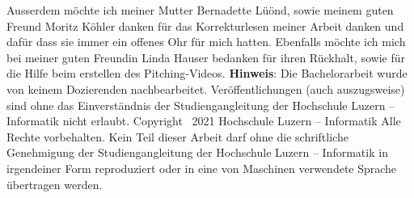 Ausserdem möchte ich meiner Mutter Bernadette Lüönd, sowie meinem guten Freund Moritz Köhler danken für das Korrekturlesen meiner Arbeit danken und dafür dass sie immer ein offenes Ohr für mich hatten.
Ebenfalls möchte ich mich bei meiner guten Freundin Linda Hauser bedanken für ihren Rückhalt, sowie für die Hilfe beim erstellen des Pitching-Videos.
\newline \newline \newline
\newline \newline \newline
\newline \newline \newline
\newline \newline \newline
{\textbf{Hinweis}}: Die Bachelorarbeit wurde von keinem Dozierenden nachbearbeitet. Ver\"offentlichungen (auch auszugsweise) sind ohne das Einverst\"andnis der Studiengangleitung der Hochschule Luzern -- Informatik nicht erlaubt.
\newline
Copyright \textcopyright\ 2021 Hochschule Luzern -- Informatik \newline \newline
Alle Rechte vorbehalten. Kein Teil dieser Arbeit darf ohne die schriftliche Genehmigung der Studiengangleitung der Hochschule Luzern -- Informatik in irgendeiner Form reproduziert oder in eine von Maschinen verwendete Sprache \"ubertragen werden.

\newpage
{}

